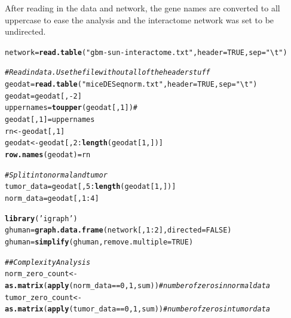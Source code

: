 \documentclass{article}\usepackage[]{graphicx}\usepackage[]{color}
\makeatletter
\newcommand{\hlnum}[1]{\textcolor[rgb]{0.686,0.059,0.569}{#1}}%
\newcommand{\hlstr}[1]{\textcolor[rgb]{0.192,0.494,0.8}{#1}}%
\newcommand{\hlcom}[1]{\textcolor[rgb]{0.678,0.584,0.686}{\textit{#1}}}%
\newcommand{\hlopt}[1]{\textcolor[rgb]{0,0,0}{#1}}%
\newcommand{\hlstd}[1]{\textcolor[rgb]{0.345,0.345,0.345}{#1}}%
\newcommand{\hlkwb}[1]{\textcolor[rgb]{0.69,0.353,0.396}{#1}}%
\newcommand{\hlkwc}[1]{\textcolor[rgb]{0.333,0.667,0.333}{#1}}%
\newcommand{\hlkwd}[1]{\textcolor[rgb]{0.737,0.353,0.396}{\textbf{#1}}}%
\newenvironment{kframe}{%
 \def\at@end@of@kframe{}%
 \ifinner\ifhmode%
  \def\at@end@of@kframe{\end{minipage}}%
  \begin{minipage}{\columnwidth}%
 \fi\fi%
 \def\FrameCommand##1{\hskip\@totalleftmargin \hskip-\fboxsep
 \colorbox{shadecolor}{##1}\hskip-\fboxsep
     \hskip-\linewidth \hskip-\@totalleftmargin \hskip\columnwidth}%
 \MakeFramed {\advance\hsize-\width
   \@totalleftmargin\z@ \linewidth\hsize
   \@setminipage}}%
 {\par\unskip\endMakeFramed%
 \at@end@of@kframe}
\newenvironment{knitrout}{}{} %
\makeatother
\begin{document}
After reading in the data and network, the gene names are converted to all uppercase to ease the analysis and the interactome network was set to be undirected.

\begin{knitrout}\small
{}\color{fgcolor}\begin{kframe}
\begin{alltt}
\hlstd{network} \hlkwb{=} \hlkwd{read.table}\hlstd{(}\hlstr{"gbm-sun-interactome.txt"}\hlstd{,} \hlkwc{header} \hlstd{=} \hlnum{TRUE}\hlstd{,}\hlkwc{sep} \hlstd{=} \hlstr{"\textbackslash{}t"}\hlstd{)}

\hlcom{# Read in data.  Use the file without all of the header stuff}
\hlstd{geodat} \hlkwb{=} \hlkwd{read.table}\hlstd{(}\hlstr{"miceDESeqnorm.txt"}\hlstd{,}\hlkwc{header}\hlstd{=}\hlnum{TRUE}\hlstd{,}\hlkwc{sep}\hlstd{=}\hlstr{"\textbackslash{}t"}\hlstd{)}
\hlstd{geodat} \hlkwb{=} \hlstd{geodat[,}\hlopt{-}\hlnum{2}\hlstd{]}
\hlstd{uppernames} \hlkwb{=} \hlkwd{toupper}\hlstd{(geodat[,}\hlnum{1}\hlstd{])} \hlcom{# }
\hlstd{geodat[,}\hlnum{1}\hlstd{]} \hlkwb{=} \hlstd{uppernames}
\hlstd{rn} \hlkwb{<-}\hlstd{geodat[,}\hlnum{1}\hlstd{]}
\hlstd{geodat} \hlkwb{<-}\hlstd{geodat[,}\hlnum{2}\hlopt{:}\hlkwd{length}\hlstd{(geodat[}\hlnum{1}\hlstd{,])]}
\hlkwd{row.names}\hlstd{(geodat)}\hlkwb{=}\hlstd{rn}


\hlcom{# Split into normal and tumor}
\hlstd{tumor_data} \hlkwb{=} \hlstd{geodat[,}\hlnum{5}\hlopt{:}\hlkwd{length}\hlstd{(geodat[}\hlnum{1}\hlstd{,])]}
\hlstd{norm_data} \hlkwb{=} \hlstd{geodat[,}\hlnum{1}\hlopt{:}\hlnum{4}\hlstd{]}

\hlkwd{library}\hlstd{(}\hlstr{'igraph'}\hlstd{)}
\hlstd{ghuman} \hlkwb{=} \hlkwd{graph.data.frame}\hlstd{(network[,}\hlnum{1}\hlopt{:}\hlnum{2}\hlstd{],} \hlkwc{directed} \hlstd{=} \hlnum{FALSE}\hlstd{)}
\hlstd{ghuman} \hlkwb{=} \hlkwd{simplify}\hlstd{(ghuman,}\hlkwc{remove.multiple}\hlstd{=}\hlnum{TRUE}\hlstd{)}


\hlcom{## Complexity Analysis}
\hlstd{norm_zero_count} \hlkwb{<-}\hlkwd{as.matrix}\hlstd{(}\hlkwd{apply}\hlstd{(norm_data} \hlopt{==} \hlnum{0}\hlstd{,} \hlnum{1}\hlstd{, sum))} \hlcom{# number of zeros in normal data}
\hlstd{tumor_zero_count} \hlkwb{<-} \hlkwd{as.matrix}\hlstd{(}\hlkwd{apply}\hlstd{(tumor_data} \hlopt{==} \hlnum{0}\hlstd{,} \hlnum{1}\hlstd{, sum))} \hlcom{# number of zeros in tumor data}
\end{alltt}
\end{kframe}
\end{knitrout}
\end{document}
